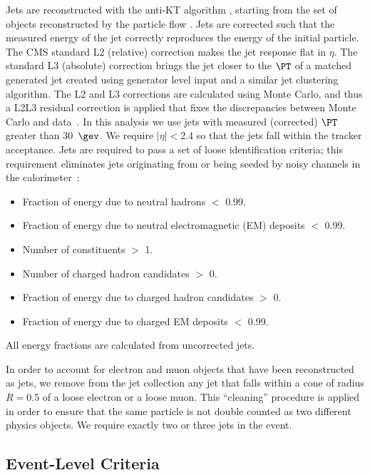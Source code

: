 Jets are reconstructed with the anti-KT algorithm \cite{cacciari}, 
starting from the set of objects reconstructed by the particle 
flow \cite{pflow,CMS-PAS-JME-10-003,CMS-PAS-PFT-10-002}.
Jets are corrected such that the measured energy of the jet 
correctly reproduces the energy of the initial particle. 
The CMS standard L2 (relative) correction makes the jet response flat in $\eta$.
The standard L3 (absolute) correction brings the jet closer to the $\PT$ of 
a matched generated jet created using generator level input and a similar 
jet clustering algorithm.
The L2 and L3 corrections are calculated using Monte Carlo, and thus a 
L2L3 residual correction is applied that fixes the discrepancies between 
Monte Carlo and data~\cite{newjes-cms}.
In this analysis we use jets with measured (corrected) $\PT$  
greater than 30~$\gev$. 
We require $|\eta| < 2.4$ so that the jets fall within the
tracker acceptance.  
Jets are required to pass a set of loose identification
criteria; this requirement eliminates jets originating from or being seeded by
noisy channels in the calorimeter~\cite{Chatrchyan:2009hy}: 
\begin{itemize}
\item Fraction of energy due to neutral hadrons $<$ 0.99.
\item Fraction of energy due to neutral electromagnetic (EM) deposits $<$ 0.99.
\item Number of constituents $>$ 1.
\item Number of charged hadron candidates $>$ 0.
\item Fraction of energy due to charged hadron candidates $>$ 0.
\item Fraction of energy due to charged EM deposits $<$ 0.99.
\end{itemize}
All energy fractions are calculated from uncorrected jets.

\par
In order to account for electron and muon objects that
have been reconstructed as jets, we remove from the jet
collection any jet that falls within a
cone of radius $R= 0.5$ of a loose electron or a loose muon. 
This ``cleaning'' procedure is applied in order to ensure that the same
particle is not double counted as two different physics objects.
We require exactly two or three jets in the event.


\subsection{Event-Level Criteria}

